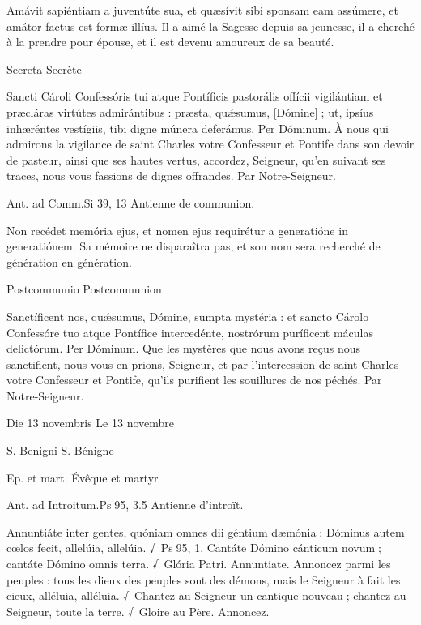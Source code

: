 \begin{paracol}{2}
Amávit sapiéntiam a juventúte sua, et quæsívit sibi sponsam eam assúmere, et amátor factus est formæ illíus.
\switchcolumn
Il a aimé la Sagesse depuis sa jeunesse, il a cherché à la prendre pour épouse, et il est devenu amoureux de sa beauté.
\switchcolumn*

Secreta
\switchcolumn
Secrète
\switchcolumn*

Sancti Cároli Confessóris tui  atque Pontíficis pastorális offícii vigilántiam et præcláras virtútes admirántibus : præsta, quǽsumus, [Dómine] ; ut, ipsíus inhæréntes vestígiis, tibi digne múnera deferámus. Per Dóminum.
\switchcolumn
À nous qui admirons la vigilance de saint  Charles votre Confesseur et Pontife dans son devoir de pasteur, ainsi que ses hautes vertus, accordez, Seigneur, qu’en suivant ses traces, nous vous fassions de dignes offrandes. Par Notre-Seigneur.
\switchcolumn*

Ant. ad Comm.\hfill Si 39, 13
\switchcolumn
Antienne de communion.
\switchcolumn*

Non recédet memória ejus, et nomen ejus requirétur a generatióne in generatiónem.
\switchcolumn
Sa mémoire ne disparaîtra pas, et son nom sera recherché de génération en génération.
\switchcolumn*

Postcommunio
\switchcolumn
Postcommunion
\switchcolumn*

Sanctíficent nos, quǽsumus, Dómine,  sumpta mystéria : et sancto Cárolo Confessóre tuo atque Pontífice intercedénte, nostrórum puríficent máculas delictórum. Per Dóminum.
\switchcolumn
Que les mystères que nous avons reçus  nous sanctifient, nous vous en prions, Seigneur, et par l’intercession de saint Charles votre Confesseur et Pontife, qu’ils purifient les souillures de nos péchés. Par Notre-Seigneur.
\switchcolumn*

Die 13 novembris
\switchcolumn
Le 13 novembre
\switchcolumn*

S. Benigni
\switchcolumn
S. Bénigne
\switchcolumn*

Ep. et mart.
\switchcolumn
Évêque et martyr
\switchcolumn*

Ant. ad Introitum.\hfill Ps 95, 3.5
\switchcolumn
Antienne d’introït.
\switchcolumn*

Annuntiáte inter gentes, quóniam  omnes dii géntium dæmónia : Dóminus autem cœlos fecit, allelúia, allelúia. √~Ps 95, 1. Cantáte Dómino cánticum novum ; cantáte Dómino omnis terra. √~Glória Patri. Annuntiate.
\switchcolumn
Annoncez parmi les peuples : tous les  dieux des peuples sont des démons, mais le Seigneur à fait les cieux, alléluia, alléluia. √~Chantez au Seigneur un cantique nouveau ; chantez au Seigneur, toute la terre. √~Gloire au Père. Annoncez.
\switchcolumn*


\end{paracol}
